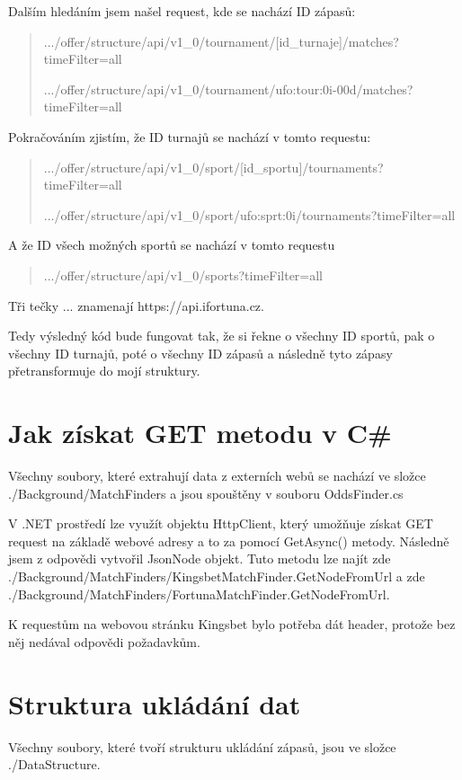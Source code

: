 \documentclass[11pt,a4paper,twoside,openright]{report}
\begin{document}
Dalším hledáním jsem našel  request, kde se nachází ID zápasů:

\begin{quote}
.../offer/structure/api/v1\_0/tournament/[id\_turnaje]/matches?timeFilter=all
	
.../offer/structure/api/v1\_0/tournament/ufo:tour:0i-00d/matches?timeFilter=all
\end{quote}

Pokračováním zjistím, že ID turnajů se nachází v tomto requestu:

\begin{quote}
.../offer/structure/api/v1\_0/sport/[id\_sportu]/tournaments?timeFilter=all
	
.../offer/structure/api/v1\_0/sport/ufo:sprt:0i/tournaments?timeFilter=all
\end{quote}
 
 A že ID všech možných sportů se nachází v tomto requestu
 
\begin{quote}
.../offer/structure/api/v1\_0/sports?timeFilter=all
 \end{quote}
 
Tři tečky ... znamenají https://api.ifortuna.cz. 

Tedy výsledný kód bude fungovat tak, že si řekne o všechny ID sportů, pak o všechny ID turnajů, poté o všechny ID zápasů a následně tyto zápasy přetransformuje do mojí struktury. 
 
 \section{Jak získat GET metodu v C\#}
Všechny soubory, které extrahují data z externích webů se nachází ve složce ./Background/MatchFinders a jsou spouštěny v souboru OddsFinder.cs

V .NET prostředí lze využít objektu HttpClient, který umožňuje získat GET request na základě webové adresy a to za pomocí GetAsync() metody. Následně jsem z odpovědi vytvořil JsonNode objekt. Tuto metodu lze najít zde ./Background/MatchFinders/KingsbetMatchFinder.GetNodeFromUrl a zde ./Background/MatchFinders/FortunaMatchFinder.GetNodeFromUrl.

K requestům na webovou stránku Kingsbet bylo potřeba dát header, protože bez něj nedával odpovědi požadavkům.

\section{Struktura ukládání dat}
Všechny soubory, které tvoří strukturu ukládání zápasů, jsou ve složce ./DataStructure.
\end{document}
